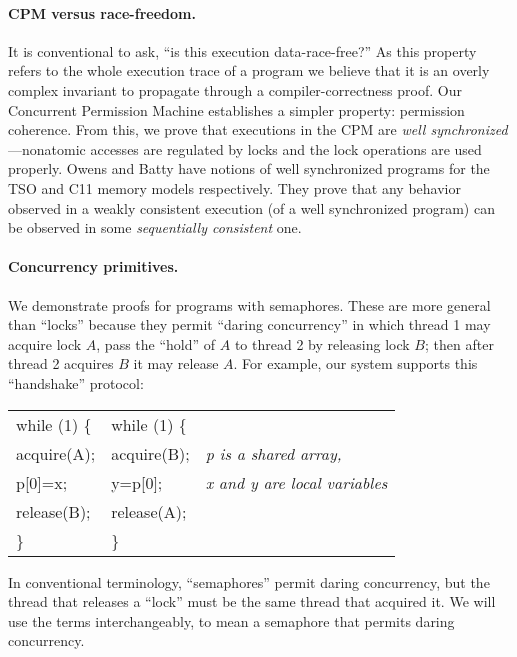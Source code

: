 \paragraph{CPM versus race-freedom.}  It is conventional to ask, ``is
this execution data-race-free?''  As this property refers to the whole
execution trace of a program we believe that it is an overly complex
invariant to propagate through a compiler-correctness proof.  Our
Concurrent Permission Machine establishes a simpler property:
permission coherence.  From this, we prove that executions in the CPM
are \emph{well synchronized}---nonatomic accesses are regulated by
locks and the lock operations are used properly. Owens \cite[Theorem
2]{owens10:ecoop} and Batty \cite[pg. 178, Theorem 13]{Batty:PhD} have
notions of well synchronized programs for the TSO and C11 memory
models respectively.  They prove that any behavior observed in a weakly 
consistent execution (of a well synchronized program) can be observed 
in some \emph{sequentially consistent} one.

\paragraph{Concurrency primitives.} 
We demonstrate proofs for programs with semaphores.  
These are more general than
``locks'' because they permit ``daring concurrency''
\cite{ohearn07:tcs}
in which thread 1 may acquire lock $A$, pass the ``hold'' of $A$
to thread 2 by releasing lock $B$; then after thread 2 acquires $B$
it may release $A$.  For example, our system supports this ``handshake''
protocol:

\begin{tabular}{l@{\qquad\qquad}l@{\qquad\qquad\qquad}l}
    while (1) \{  & while (1) \{ \\
    \quad acquire(A); & \quad acquire(B); &  \emph{p is a shared array,}
 \\
    \quad p[0]=x;     & \quad y=p[0];   & \emph{x and y are local variables}  \\
    \quad release(B); & \quad release(A); \\
    \}            & \}            \\
  \end{tabular}

\noindent In conventional terminology,
``semaphores'' permit daring concurrency,
but the thread that releases a ``lock'' must be the same thread that acquired it.
We will use the terms interchangeably, to mean a semaphore that
permits daring concurrency.

